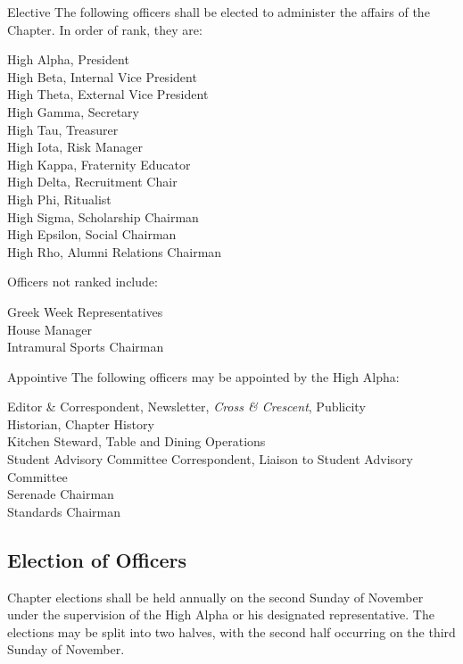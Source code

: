 \documentclass{article}
\begin{document}
\begin{subsubsectionList}
  \item {\titleStyle Elective\titleSuffix}
  The following officers shall be elected to administer the affairs of the
  Chapter. In order of rank, they are:

  High Alpha, President\\
  High Beta, Internal Vice President\\
  High Theta, External Vice President\\
  High Gamma, Secretary\\
  High Tau, Treasurer\\
  High Iota, Risk Manager\\
  High Kappa, Fraternity Educator\\
  High Delta, Recruitment Chair\\
  High Phi, Ritualist\\
  High Sigma, Scholarship Chairman\\
  High Epsilon, Social Chairman\\
  High Rho, Alumni Relations Chairman

  Officers not ranked include:

  Greek Week Representatives\\
  House Manager\\
  Intramural Sports Chairman

  \item {\titleStyle Appointive\titleSuffix}
  The following officers may be appointed by the High Alpha:

  Editor \& Correspondent, Newsletter, \emph{Cross \& Crescent}, Publicity\\
  Historian, Chapter History\\
  Kitchen Steward, Table and Dining Operations\\
  Student Advisory Committee Correspondent, Liaison to Student Advisory
  Committee\\
  Serenade Chairman\\
  Standards Chairman
\end{subsubsectionList}

\subsection{Election of Officers}

Chapter elections shall be held annually on the second Sunday of November under
the supervision of the High Alpha or his designated representative. The
elections may be split into two halves, with the second half occurring on the
third Sunday of November.
\end{document}

